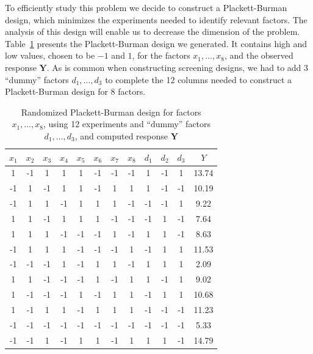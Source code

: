 \documentclass[conference]{IEEEtran}
\begin{document}
To efficiently study this problem we decide to construct a Plackett-Burman
design, which minimizes the experiments needed to identify relevant factors. The
analysis of this design will enable us to decrease the dimension of the problem.
Table~\ref{tab:plackett} presents the Plackett-Burman design we generated.
It contains high and low values, chosen to be \(-1\) and \(1\), for the factors
\(x_1,\dots,x_8\), and the observed response \(\mathbf{Y}\). As is common when
constructing screening designs, we had to add 3 ``dummy'' factors
\(d_1,\dots,d_3\) to complete the 12 columns needed to construct a Plackett-Burman
design for 8 factors.

\begin{table}[ht]
\centering
\caption{Randomized Plackett-Burman design for factors $x_1, \dots, x_8$, using 12 experiments and ``dummy'' factors $d_1, \dots, d_3$, and computed response $\mathbf{Y}$}
\label{tab:plackett}
\begingroup\scriptsize
\begin{tabular}{cccccccccccc}
  \toprule
$x_1$ & $x_2$ & $x_3$ & $x_4$ & $x_5$ & $x_6$ & $x_7$ & $x_8$ & $d_1$ & $d_2$ & $d_3$ & $Y$ \\
  \midrule
1 & -1 & 1 & 1 & 1 & -1 & -1 & -1 & 1 & -1 & 1 & 13.74 \\
  -1 & 1 & -1 & 1 & 1 & -1 & 1 & 1 & 1 & -1 & -1 & 10.19 \\
  -1 & 1 & 1 & -1 & 1 & 1 & 1 & -1 & -1 & -1 & 1 & 9.22 \\
  1 & 1 & -1 & 1 & 1 & 1 & -1 & -1 & -1 & 1 & -1 & 7.64 \\
  1 & 1 & 1 & -1 & -1 & -1 & 1 & -1 & 1 & 1 & -1 & 8.63 \\
  -1 & 1 & 1 & 1 & -1 & -1 & -1 & 1 & -1 & 1 & 1 & 11.53 \\
  -1 & -1 & -1 & 1 & -1 & 1 & 1 & -1 & 1 & 1 & 1 & 2.09 \\
  1 & 1 & -1 & -1 & -1 & 1 & -1 & 1 & 1 & -1 & 1 & 9.02 \\
  1 & -1 & -1 & -1 & 1 & -1 & 1 & 1 & -1 & 1 & 1 & 10.68 \\
  1 & -1 & 1 & 1 & -1 & 1 & 1 & 1 & -1 & -1 & -1 & 11.23 \\
  -1 & -1 & -1 & -1 & -1 & -1 & -1 & -1 & -1 & -1 & -1 & 5.33 \\
  -1 & -1 & 1 & -1 & 1 & 1 & -1 & 1 & 1 & 1 & -1 & 14.79 \\
   \bottomrule
\end{tabular}
\endgroup
\end{table}
\end{document}
